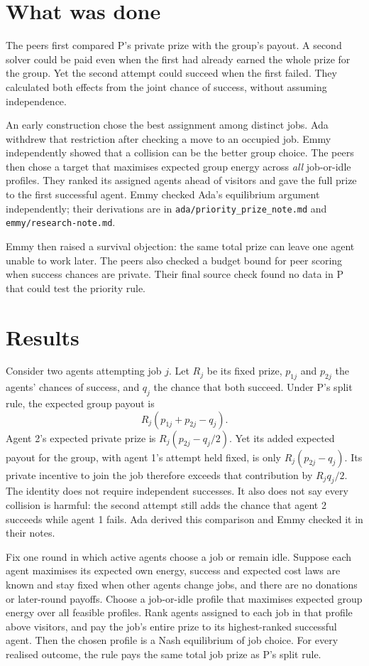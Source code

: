 \documentclass{article}
\begin{document}
\section{What was done}

The peers first compared P's private prize with the group's payout. A second solver could be paid
even when the first had already earned the whole prize for the group. Yet the second attempt could
succeed when the first failed. They calculated both effects from the joint chance of success,
without assuming independence.

An early construction chose the best assignment among distinct jobs. Ada withdrew that restriction
after checking a move to an occupied job. Emmy independently showed that a collision can be the
better group choice. The peers then chose a target that maximises expected group energy across
\emph{all} job-or-idle profiles. They ranked its assigned agents ahead of visitors and gave the full
prize to the first successful agent. Emmy checked Ada's equilibrium argument independently; their
derivations are in \texttt{ada/priority\_prize\_note.md} and \texttt{emmy/research-note.md}.

Emmy then raised a survival objection: the same total prize can leave one agent unable to work
later. The peers also checked a budget bound for peer scoring when success chances are private.
Their final source check found no data in P that could test the priority rule.

\section{Results}

Consider two agents attempting job \(j\). Let \(R_j\) be its fixed prize, \(p_{1j}\) and \(p_{2j}\)
the agents' chances of success, and \(q_j\) the chance that both succeed. Under P's split rule, the
expected group payout is
\[
R_j(p_{1j}+p_{2j}-q_j).
\]
Agent 2's expected private prize is \(R_j(p_{2j}-q_j/2)\). Yet its added expected payout for the
group, with agent 1's attempt held fixed, is only \(R_j(p_{2j}-q_j)\). Its private incentive to join
the job therefore exceeds that contribution by \(R_jq_j/2\). The identity does not require
independent successes. It also does not say every collision is harmful: the second attempt still
adds the chance that agent 2 succeeds while agent 1 fails. Ada derived this comparison and Emmy
checked it in their notes.

\begin{proposition}
Fix one round in which active agents choose a job or remain idle. Suppose each agent maximises its
expected own energy, success and expected cost laws are known and stay fixed when other agents
change jobs, and there are no donations or later-round payoffs. Choose a job-or-idle profile that
maximises expected group energy over all feasible profiles. Rank agents assigned to each job in that
profile above visitors, and pay the job's entire prize to its highest-ranked successful agent. Then
the chosen profile is a Nash equilibrium of job choice. For every realised outcome, the rule pays
the same total job prize as P's split rule.
\end{proposition}
\end{document}

